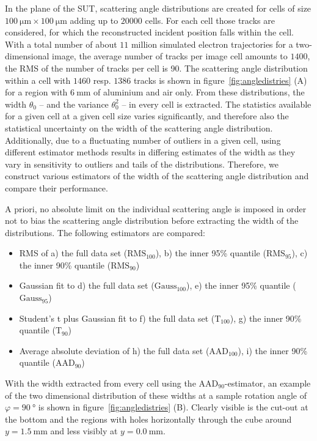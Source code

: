 \documentclass{PoS}
\newcommand{\rmshundred}{\ensuremath{\textrm{RMS}_\textrm{100}}}
\newcommand{\rmsninetyfive}{\ensuremath{\textrm{RMS}_\textrm{95}}}
\newcommand{\rmsninety}{\ensuremath{\textrm{RMS}_\textrm{90}}}
\newcommand{\gausshundred}{\ensuremath{\textrm{Gauss}_\textrm{100}}}
\newcommand{\gaussninety}{\ensuremath{\textrm{Gauss}_\textrm{95}}}
\newcommand{\studhundred}{\ensuremath{\textrm{T}_\textrm{100}}}
\newcommand{\studninety}{\ensuremath{\textrm{T}_\textrm{90}}}
\newcommand{\aadhundred}{\ensuremath{\textrm{AAD}_\textrm{100}}}
\newcommand{\aadninety}{\ensuremath{\textrm{AAD}_\textrm{90}}}
\begin{document}
In the plane of the SUT, scattering angle distributions are created for cells of size $\SI{100}{\um} \times \SI{100}{\um}$ adding up to $\num{20000}$ cells.
For each cell those tracks are considered, for which the reconstructed incident position falls within the cell. 
With a total number of about $11$ million simulated electron trajectories for a two-dimensional image, the average number of tracks per image cell amounts to $1400$, the RMS of the number of tracks per cell is 90.
The scattering angle distribution within a cell with $1460$ resp. $1386$ tracks is shown in figure~\ref{fig:angledistries} (A) for a region with $\SI{6}{\mm}$ of aluminium and air only.
From these distributions, the width $\theta_0$ -- and the variance $\theta_0^2$ -- in every cell is extracted. 
The statistics available for a given cell at a given cell size varies significantly, and therefore also the statistical uncertainty on the width of the scattering angle distribution. 
Additionally, due to a fluctuating number of outliers in a given cell, using different estimator methods results in differing estimates of the width as they vary in sensitivity to outliers and tails of the distributions. 
Therefore, we construct various estimators of the width of the scattering angle distribution and compare their performance. 

A priori, no absolute limit on the individual scattering angle is imposed in order not to bias the scattering angle distribution before extracting the width of the distributions. 
The following estimators are compared:
\begin{itemize}\itemsep0pt
 \item RMS of a) the full data set ($\rmshundred$), b) the inner 95\% quantile ($\rmsninetyfive$), c) the inner 90\% quantile ($\rmsninety$)
 \item Gaussian fit to d) the full data set ($\gausshundred$), e) the inner 95\% quantile ($\gaussninety$)
 \item Student's t plus Gaussian fit to f) the full data set ($\studhundred$), g) the inner 90\% quantile ($\studninety$)
 \item Average absolute deviation of h) the full data set ($\aadhundred$), i) the inner 90\% quantile ($\aadninety$)
 
\end{itemize}

With the width extracted from every cell using the $\aadninety$-estimator,
 an example of the two dimensional distribution of these widths at a sample rotation angle of $\varphi = \SI{90}{\degree}$ is shown in figure~\ref{fig:angledistries} (B). 
Clearly visible is the cut-out at the bottom and the regions with holes horizontally through the cube around $y=\SI{1.5}{\mm}$ and less visibly at $y=\SI{0.0}{\mm}$.
\end{document}
